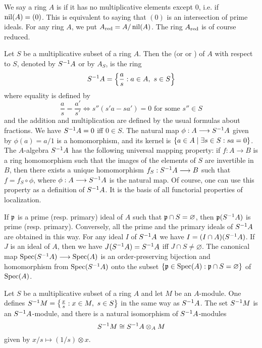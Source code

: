 \documentclass[../main]{subfiles}
\begin{document}
We say a ring $A$ is  if it has no multiplicative elements except 0, i.e. if $\operatorname{nil}(A)=(0)$. This is equivalent to saying that $(0)$ is an intersection of prime ideals. For any ring $A$, we put $A_{\text{red}}=A/\operatorname{nil}(A)$. The ring $A_{\text{red}}$ is of course reduced.

\newparagraph
Let $S$ be a multiplicative subset of a ring $A$. Then the  (or  or ) of $A$ with respect to $S$, denoted by $S^{-1} A$ or by $A_S$, is the ring
\[S^{-1} A = \left\{\frac as: a\in A,~s\in S\right\}\]
where equality is defined by
\[\frac as = \frac{a'}{s'}
\iff s''(s'a-sa') = 0 \text{ for some }s''\in S\]
and the addition and multiplication are defined by the usual formulas about fractions. We have $S^{-1} A=0$ iff $0\in S$. The natural map $\phi:A\longrightarrow S^{-1} A$ given by $\phi(a)=a/1$ is a homomorphism, and its kernel is $\left\{a\in A\mid \exists s\in S: sa=0\right\}$. The $A$-algebra $S^{-1} A$ has the following universal mapping property: if $f:A\longrightarrow B$ is a ring homomorphism such that the images of the elements of $S$ are invertible in $B$, then there exists a unique homomorphism $f_S:S^{-1} A\longrightarrow B$ such that $f=f_S\circ\phi$, where $\phi:A\longrightarrow S^{-1} A$ is the natural map. Of course, one can use this property as a definition of $S^{-1} A$. It is the basis of all functorial properties of localization.

If $\mathfrak{p}$ is a prime (resp. primary) ideal of $A$ such that $\mathfrak{p}\cap S=\varnothing$, then $\mathfrak{p}(S^{-1} A)$ is prime (resp. primary). Conversely, all the prime and the primary ideals of $S^{-1} A$ are obtained in this way. For any ideal $I$ of $S^{-1} A$ we have $I=(I\cap A)(S^{-1} A)$. If $J$ is an ideal of $A$, then we have $J(S^{-1} A)=S^{-1} A$ iff $J\cap S\ne\varnothing$. The canonical map $\operatorname{Spec}(S^{-1} A)\longrightarrow\operatorname{Spec}(A)$ is an order-preserving bijection and homomorphism from $\operatorname{Spec}(S^{-1} A)$ onto the subset $\left\{\mathfrak{p}\in\operatorname{Spec}(A): \mathfrak{p}\cap S=\varnothing\right\}$ of $\operatorname{Spec}(A)$.

\newparagraph
Let $S$ be a multiplicative subset of a ring $A$ and let $M$ be an $A$-module. One defines $S^{-1} M=\left\{\frac xs:x\in M,~s\in S\right\}$ in the same way as $S^{-1} A$. The set $S^{-1} M$ is an $S^{-1} A$-module, and there is a natural isomorphism of $S^{-1} A$-modules
\[S^{-1} M \cong S^{-1} A \otimes_A M\]
given by $x/s\mapsto(1/s)\otimes x$.
\end{document}
